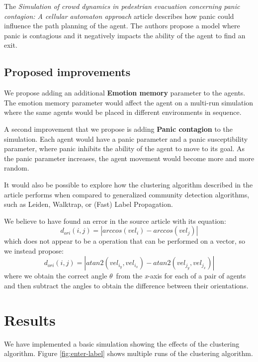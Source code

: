 \documentclass[9pt]{pnas-new}
\begin{document}
The \textit{Simulation of crowd dynamics in pedestrian evacuation concerning panic contagion: A cellular automaton approach} article describes how panic could influence the path planning of the agent.
The authors propose a model where panic is contagious and it negatively impacts the ability of the agent to find an exit.\cite{Wang_2022}
\subsection{Proposed improvements}
We propose adding an additional \textbf{Emotion memory} parameter to the agents. The emotion memory parameter would affect the agent on a multi-run simulation where the same agents would be placed in different environments in sequence.


A second improvement that we propose is adding \textbf{Panic contagion} to the simulation. Each agent would have a panic parameter and a panic susceptibility parameter, where panic inhibits the ability of the agent to move to its goal. As the panic parameter increases, the agent movement would become more and more random.

It would also be possible to explore how the clustering algorithm described in the article performs when compared to generalized community detection algorithms, such as Leiden, Walktrap, or (Fast) Label Propagation.


We believe to have found an error in the source article with its equation: \begin{equation*}
    d_{ori}(i,j)=|arccos(vel_i)-arccos(vel_j)|
\end{equation*}
which does not appear to be a operation that can be performed on a vector, so we instead propose: \begin{equation*}
    d_{ori}(i,j)=|atan2(vel_{i_y},vel_{i_x})-atan2(vel_{j_y},vel_{j_x})|
\end{equation*}
where we obtain the correct angle ${\theta}$\ from the \textit{x}-axis \cite{wikiatan2} for each of a pair of agents and then subtract the angles to obtain the difference between their orientations.
\cite{Wu_Huang_Tian_Yan_Yu_2024}
\section{Results}
We have implemented a basic simulation showing the effects of the clustering algorithm. Figure \ref{fig:enter-label} shows multiple runs of the clustering algorithm.
\end{document}
